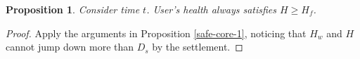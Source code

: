 \documentclass[notitlepage,reqno,11pt]{amsart}
\numberwithin{equation}{section}
\newtheorem{prop}{Proposition}[section]
\newtheorem{remark}{Remark}[section]
\begin{document}
\begin{prop}\label{safe-core-2}
    Consider time $t$. User's health always satisfies $H \geq H_f$. 
\end{prop}
\begin{proof}
    Apply the arguments in Proposition \ref{safe-core-1}, noticing that $H_w$ and $H$ cannot jump down more than $D_s$ by the settlement.
\end{proof}










    
\end{document}

